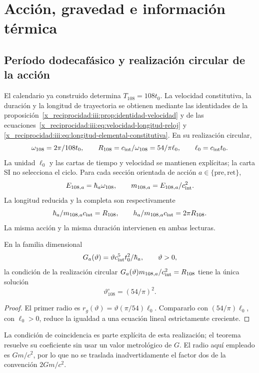 

\chapter{Acción, gravedad e información térmica}
\label{x_reciprocidad:v:ant:sec:gravity}
\section{Período dodecafásico y realización circular de la acción}
El calendario ya construido determina $T_{108}=108t_0$.
La velocidad constitutiva, la duración y la longitud de trayectoria se
obtienen mediante las identidades de la
proposición~\ref{x_reciprocidad:iii:prop:identidad-velocidad} y de las
ecuaciones~\eqref{x_reciprocidad:iii:eq:velocidad-longitud-reloj} y
\eqref{x_reciprocidad:iii:eq:longitud-elemental-constitutiva}.
En su realización circular,
\[
\omega_{108}=\frac{2\pi}{108t_0},\qquad
R_{108}=\frac{c_{\rm int}}{\omega_{108}}
=\frac{54}{\pi}\ell_0,\qquad \ell_0=c_{\rm int}t_0.
\]
La unidad $\ell_0$ y las cartas de tiempo y velocidad se mantienen
explícitas; la carta SI no selecciona el ciclo.
Para cada sección orientada de acción $a\in\{\mathrm{pre},\mathrm{ret}\}$,
\[
E_{108,a}=\hbar_a\omega_{108},\qquad
m_{108,a}=\frac{E_{108,a}}{c_{\rm int}^2}.
\]
La longitud reducida y la completa son respectivamente
\[
\frac{\hbar_a}{m_{108,a}c_{\rm int}}=R_{108},
\qquad
\frac{h_a}{m_{108,a}c_{\rm int}}=2\pi R_{108}.
\]
La misma acción y la misma duración intervienen en ambas lecturas.

\begin{proposition}
En la familia dimensional
\[
G_a(\vartheta)=\vartheta\frac{c_{\rm int}^5t_0^2}{\hbar_a},
\qquad \vartheta>0,
\]
la condición de la realización circular
$G_a(\vartheta)m_{108,a}/c_{\rm int}^2=R_{108}$
tiene la única solución
\[
\vartheta^\circ_{108}=(54/\pi)^2.
\]
\end{proposition}
\begin{proof}
El primer radio es
$r_g(\vartheta)=\vartheta(\pi/54)\ell_0$.
Compararlo con $(54/\pi)\ell_0$, con $\ell_0>0$, reduce la
igualdad a una ecuación lineal estrictamente creciente.
\end{proof}
La condición de coincidencia es parte explícita de esta realización;
el teorema resuelve su coeficiente sin usar un valor metrológico de $G$.
El radio aquí empleado es $Gm/c^2$, por lo que no se traslada
inadvertidamente el factor dos de la convención $2Gm/c^2$.

